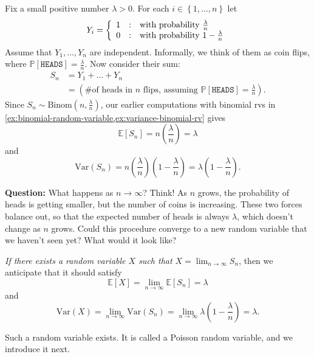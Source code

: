 \documentclass[10pt]{article}
\theoremstyle{definition}
\newcommand{\fl}{\noindent\textbf} %
\newcommand{\1}[1]{\textbf{1}_{\left[#1\right]}} %
\def\E{\mathbb{E}} %
\def\P{\mathbb{P}} %
\def\Var{\mathrm{Var}} %
\begin{document}
Fix a small positive number $\lambda>0$. For each $i\in
\left\{1,\ldots,n\right\}$ let
\begin{equation*}
  Y_{i}= \left\{ \begin{array}{l@{\quad:\quad}l} 1 &\text{with probability }\frac{\lambda}{n} \\
      0& \text{with probability } 1-\frac{\lambda}{n} \end{array}\right.
\end{equation*}
Assume that $Y_{1},\ldots,Y_{n}$ are independent. Informally, we think of them
as coin flips, where $\P[\mathtt{HEADS}]=\frac{\lambda}{n}$. Now consider
their sum:
\begin{align*}
  S_{n} 
  &= Y_{1}+\ldots+Y_{n}\\
  &= \left(\text{\# of heads in $n$ flips, assuming $\P[\mathtt{HEADS}]=\frac{\lambda}{n}$} \right).
\end{align*}
Since $S_{n}\sim \text{Binom}(n, \frac{\lambda}{n})$, our earlier computations
with binomial rvs in
\cref{ex:binomial-random-variable,ex:variance-binomial-rv} gives
\begin{equation*}
  \E\left[S_{n} \right]= n \left( \frac{\lambda}{n} \right) = \lambda 
\end{equation*}
and
\begin{equation*}
  \Var(S_{n}) = n \left( \frac{\lambda}{n} \right) \left( 1-\frac{\lambda}{n} \right) = \lambda \left( 1-\frac{\lambda}{n} \right).
\end{equation*}

\fl{Question:} What happens as $n \to \infty$? Think! As $n$ grows, the
probability of heads is getting smaller, but the number of coins is
increasing. These two forces balance out, so that the expected number of heads
is always $\lambda$, which doesn't change as $n$ grows. Could this procedure
converge to a new random variable that we haven't seen yet? What would it look
like?

\textit{If there exists a random variable $X$ such that
  $X = \lim_{n\to\infty}S_{n}$}, then we anticipate that it should satisfy
\begin{equation*}
  \E[X] = \lim_{n\to\infty} \E[S_{n}] = \lambda
\end{equation*}
and
\begin{equation*}
  \Var(X) = \lim_{n\to\infty} \Var(S_{n}) = \lim_{n\to\infty} \lambda \left( 1- \frac{\lambda}{n} \right) = \lambda. 
\end{equation*}

Such a random variable exists. It is called a
Poisson random variable, and we introduce it next.
\end{document}
